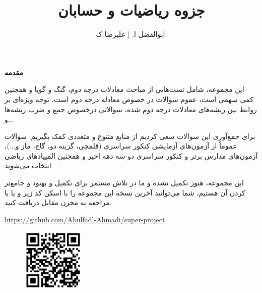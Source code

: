 \documentclass[11pt]{book}
\title{ جزوه ریاضیات و حسابان}
\author{ابوالفضل ا. | علیرضا ک.}
\newcommand{\sol}{\bigskip \bigskip \bigskip \bigskip \bigskip \bigskip }
\begin{document}
\maketitle

\thispagestyle{empty}

\bigskip



\begin{center}
	\begin{minipage}{17cm}
{\large 
	\setlength{\parindent}{1.5em}
	
	\textbf{{\huge مقدمه }}\bigskip
	
	\indent
این مجموعه، شامل تست‌هایی از مباحث معادلات درجه دوم، گنگ و گویا و همچنین کمی سهمی است، عموم سوالات در خصوص معادله درجه دوم است، توجه ویژه‌ای بر روابط بین ریشه‌های معادلات درجه دوم شده، سوالاتی درخصوص جمع و ضرب ریشه‌ها و...
\smallskip

برای جمع‌آوری این سوالات سعی کردیم از منابع متنوع و متعددی کمک بگیریم. سوالات عموماً از آزمون‌های آزمایشی کنکور سراسری (قلمچی، گزینه دو، گاج، ماز و...)، آزمون‌های مدارس برتر و کنکور سراسری دو-سه دهه اخیر و همچنین المپیادهای ریاضی انتخاب می‌شوند.\smallskip

این مجموعه، هنوز تکمیل نشده و ما در تلاش مستمر برای تکمیل و بهبود و جامع‌تر کردن‌ آن هستیم، شما می‌توانید آخرین نسخه این مجموعه را با اسکن کد زیر و یا با مراجعه به مخزن مقابل 
دریافت کنید. 

\hfill
	\url{https://github.com/Abulfadl-Ahmadi/super-project}

}\end{minipage}
\end{center}


\sol 

\begin{figure}[bp]
\begin{center}
	\includegraphics[width=3cm]{image/QrCode/github-page}
\end{center}

\bigskip

\hfill 
\end{figure}

\newpage

\clearpage
{}
	
\end{document}
